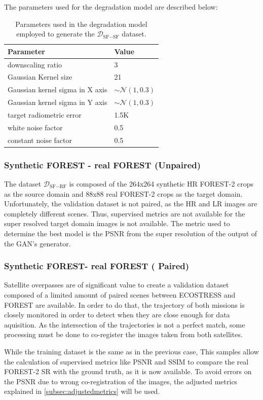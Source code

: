     The parameters used for the degradation model are described below:

    \begin{table}[H]
        \centering
        \begin{tabular}{l|l}
        Parameter & Value \\ \hline
        downscaling ratio & 3 \\ 
        Gaussian Kernel size & 21 \\ 
        Gaussian kernel sigma in X axis &  $\sim \mathcal{N}(1,0.3)$  \\ 
        Gaussian kernel sigma in Y axis &  $\sim \mathcal{N}(1,0.3)$  \\ 
        target radiometric error & 1.5K \\ 
        white noise factor & 0.5 \\ 
        constant noise factor & 0.5 \\ 
        \end{tabular}
        \caption{Parameters used in the degradation model employed to generate the $\mathcal{D}_{\text{SF}-\text{SF}}$ dataset.}
        \label{tab:degradation_model_parameters}
    \end{table}

\subsubsection{Synthetic FOREST - real FOREST (Unpaired)}
    The dataset $\mathcal{D}_{\text{SF}-\text{RF}}$ is composed of the 264x264 synthetic HR FOREST-2 crops as the source domain and  88x88 real FOREST-2 crops as the target domain. 
    Unfortunately, the validation dataset is not paired, as the HR and LR images are completely different scenes.
    Thus, supervised metrics are not available for the super resolved target domain images is not available. 
    The metric used to determine the best model is the PSNR from the super resolution of the output of the GAN's generator.

\subsubsection{Synthetic FOREST- real FOREST ( Paired)}
    Satellite overpasses are of significant value to create a validation dataset composed of a limited amount of paired scenes between ECOSTRESS and FOREST are available.  In order to do that, the trajectory of both missions is closely monitored in order to detect when they are close enough for data aquisition. As the intersection of the trajectories is not a perfect match, some processing must be done to co-register the images taken from both satellites.  
    
    While the training dataset is the same as in the previous case, 
    This samples allow the calculation of supervised metrics like PSNR and SSIM to compare the real FOREST-2 SR with the ground truth, as it is now available. To avoid errors on the PSNR due to wrong co-registration of the images, the adjusted metrics explained in \ref{subsec:adjustedmetrics} will be used.




\newpage